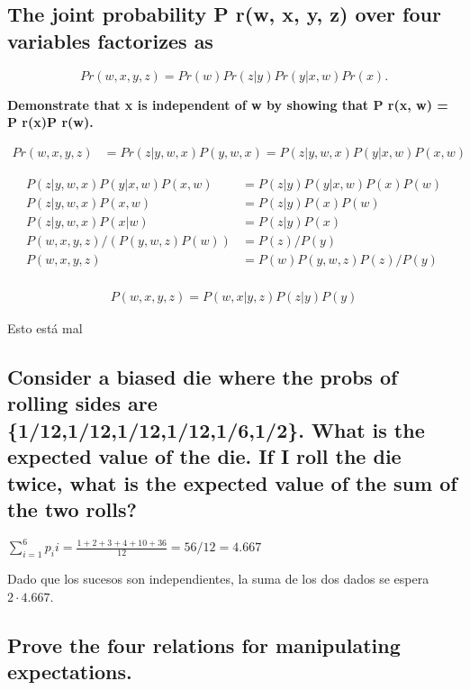 \documentclass[11pt]{article}
\begin{document}
\subsection{The joint probability P r(w, x, y, z) over four variables factorizes as}
\label{sec:orgf508882}
\[ P r(w, x, y, z) = P r(w)P r(z|y)P r(y|x, w)P r(x). \]

\textbf{Demonstrate that x is independent of w by showing that P r(x, w) = P
 r(x)P r(w).}


\begin{align}
	Pr(w,x,y,z) &= Pr(z|y,w,x) P(y,w,x) = P(z|y,w,x) P(y|x,w) P(x,w)
\end{align}


\begin{align}
  P(z|y,w,x) P(y|x,w) P(x,w) &= P(z|y) P (y|x,w) P(x) P(w)  \\
  P(z|y,w,x) P(x,w) &= P(z|y)  P(x) P(w)  \\
  P(z|y,w,x) P(x|w) &= P(z|y) P(x) \\
  P(w,x,y,z) / (P(y,w,z)P(w))  &= P(z) / P(y) \\
  P(w,x,y,z) &= P(w) P(y,w,z) P(z) / P(y) \\

\end{align}

\begin{align}
	P(w,x,y,z) = P(w,x|y,z) P(z|y) P(y) 

\end{align}

Esto está mal

\subsection{Consider a biased die where the probs of rolling sides are \{1/12,1/12,1/12,1/12,1/6,1/2\}. What is the expected value of the die. If I roll the die twice, what is the expected value of the sum of the two rolls?}
\label{sec:org438ff17}

$\sum_{i=1}^6 p_i i = \frac{1+2+3+4+10+36}{12} = 56/12 = 4.667$

Dado que los sucesos son independientes, la suma de los dos dados se espera \(2 \cdot 4.667\).

\subsection{Prove the four relations for manipulating expectations.}
\label{sec:orgb6fcb85}
\end{document}
